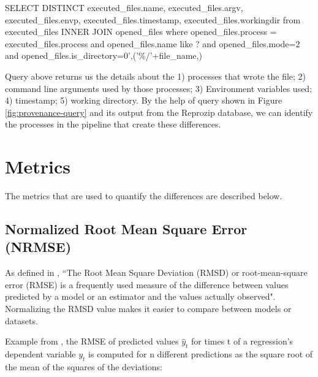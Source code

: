 \begin{tcolorbox}[colback=black!5!white,colframe=black!75!black]
SELECT DISTINCT executed\_files.name, executed\_files.argv, executed\_files.envp, executed\_files.timestamp, executed\_files.workingdir from executed\_files INNER JOIN opened\_files where opened\_files.process = executed\_files.process and opened\_files.name like ? and opened\_files.mode=2 and opened\_files.is\_directory=0',('\%/'+file\_name,)
\end{tcolorbox}
\label{fig:provenance-query}

Query above returns us the details about the 1) processes that wrote the file; 2) command line arguments used by those processes; 3) Environment variables used; 4) timestamp; 5) working directory. By the help of query shown in Figure \ref{fig:provenance-query} and its output from the Reprozip database, we can identify the processes in the pipeline that create these differences.

\section{Metrics} \label{sec:num1}
The metrics that are used to quantify the differences are described below.

\subsection{Normalized Root Mean Square Error (NRMSE)}
As defined in \cite{khosrow2017handbook}, ``The Root Mean Square Deviation (RMSD) or root-mean-square error (RMSE) is a frequently used measure of the difference between values predicted by a model or an estimator and the values actually observed". Normalizing the RMSD value makes it easier to compare between models or datasets.

Example from \cite{NRMSE}, the RMSE of predicted values ${\displaystyle {\hat {y}}_{t}}$  for times t of a regression's dependent variable ${\displaystyle y_{t}}$ is computed for n different predictions as the square root of the mean of the squares of the deviations:\\


